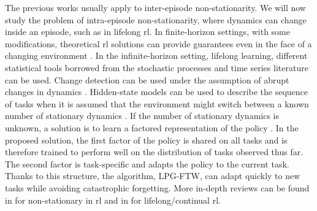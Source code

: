 The previous works usually apply to inter-episode non-stationarity. 
We will now study the problem of intra-episode non-stationarity, where dynamics can change inside an episode, such as in lifelong \gls{rl}. 
In finite-horizon settings, with some modifications, theoretical \gls{rl} solutions can provide guarantees even in the face of a changing environment \cite{hallak2015contextual,ortner2020uclr2}.
In the infinite-horizon setting, \ie lifelong learning, different statistical tools borrowed from the stochastic processes and time series literature can be used.
Change detection can be used under the assumption of abrupt changes in dynamics \cite{daSilva2006context, hadoux2014sequential}. 
Hidden-state models can be used to describe the sequence of tasks when it is assumed that the environment might switch between a known number of stationary dynamics \cite{choi2000hidden}. 
If the number of stationary dynamics is unknown, a solution is to learn a factored representation of the policy \cite{mendez2020lifelong}. 
In the proposed solution, the first factor of the policy is  
shared on all tasks and is therefore trained to perform well on the distribution of tasks observed thus far. The second factor is task-specific and adapts the policy to the current task. 
Thanks to this structure, the algorithm, LPG-FTW, can adapt quickly to new tasks while avoiding catastrophic forgetting.
More in-depth reviews can be found in  \cite{padakandla2021survey} for non-stationary in \gls{rl} and in \cite{khetarpal2020towards} for lifelong/continual \gls{rl}.

